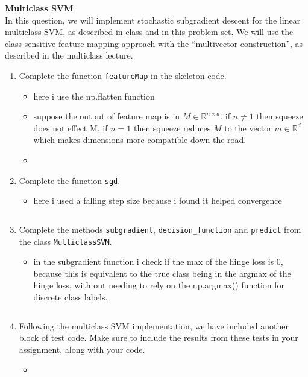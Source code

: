 \documentclass{article}
\newcommand{\nyuparagraph}[1]{\vspace{0.3cm}\textcolor{nyupurple}{\bf \large #1}\\}
\theoremstyle{plain}
\theoremstyle{definition}
\begin{document}
\nyuparagraph{Multiclass SVM}

In this question, we will implement stochastic subgradient descent
for the linear multiclass SVM, as described in class and in this
problem set. We will use the class-sensitive feature mapping approach
with the ``multivector construction'', as described in the multiclass lecture.
\begin{enumerate}
  \setcounter{enumi}{\value{saveenum}}
\item Complete the function \texttt{featureMap} in the skeleton code.
\begin{itemize}
    \color{blue}
    \item here i use the np.flatten function 
    \item suppose the output of feature map is in $M\in \mathbb{R}^{n\times d}$. if $n\neq 1$ then squeeze does not effect M, if $n=1$ then squeeze reduces $M$ to the vector $m\in \mathbb{R}^{d}$ which makes dimensions more compatible down the road. 
    \item 
             \inputminted[firstline=132, lastline=144, breaklines=True]{python}{hw_5.py}
\end{itemize}

\item Complete the function \texttt{sgd}.
\begin{itemize}
    \color{blue}
    \item here i used a falling step size because i found it helped convergence 
               \inputminted[firstline=147, lastline=170, breaklines=True]{python}{hw_5.py}
\end{itemize}

\item Complete the methods \texttt{subgradient}, \texttt{decision\_function} and \texttt{predict} from the class \texttt{MulticlassSVM}. 
\begin{itemize}
    \color{blue}
    \item in the subgradient function i check if the max of the hinge loss is 0, because this is equivalent to the true class being in the argmax of the hinge loss, with out needing to rely on the np.argmax() function for discrete class labels.  
               \inputminted[firstline=172, lastline=251, breaklines=True]{python}{hw_5.py}
\end{itemize}

\item Following the multiclass
SVM implementation, we have included another block of test code. Make
sure to include the results from these tests in your assignment, along
with your code. 
\begin{itemize}
    \color{blue}
    \item 


\end{itemize}
\end{enumerate}
\end{document}
